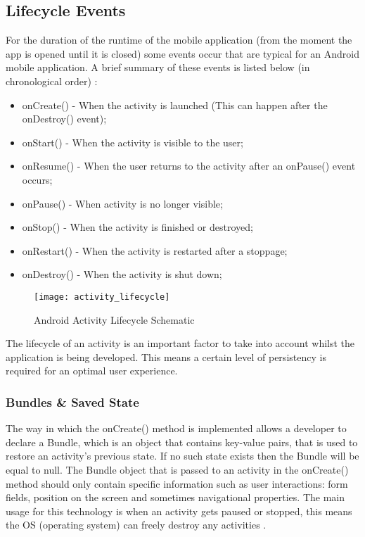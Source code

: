 \subsection{Lifecycle Events}
For the duration of the runtime of the mobile application (from the moment the app is opened until it is closed) some events occur that are typical for an Android mobile application. A brief summary of these events is listed below (in chronological order) \cite{AndroidDeveloper2019}:
\begin{itemize}
\item onCreate() - When the activity is launched (This can happen after the onDestroy() event);
\item onStart() - When the activity is visible to the user;
\item onResume() - When the user returns to the activity after an onPause() event occurs;
\item onPause() - When activity is no longer visible;
\item onStop() - When the activity is finished or destroyed;
\item onRestart() - When the activity is restarted after a stoppage;
\item onDestroy() - When the activity is shut down;
\end{itemize}
\begin{figure}[H]
\centering
\texttt{[image: activity\_lifecycle]}
\caption{Android Activity Lifecycle Schematic~\cite{AndroidDeveloper2019}}
\end{figure}
The lifecycle of an activity is an important factor to take into account whilst the application is being developed. This means a certain level of persistency is required for an optimal user experience.
\subsubsection{Bundles \& Saved State}
The way in which the onCreate() method is implemented allows a developer to declare a Bundle, which is an object that contains key-value pairs, that is used to restore an activity's previous state. If no such state exists then the Bundle will be equal to null. The Bundle object that is passed to an activity in the onCreate() method should only contain specific information such as user interactions: form fields, position on the screen and sometimes navigational properties. The main usage for this technology is when an activity gets paused or stopped, this means the OS (operating system) can freely destroy any activities \cite{JamesHalpern2012}.

